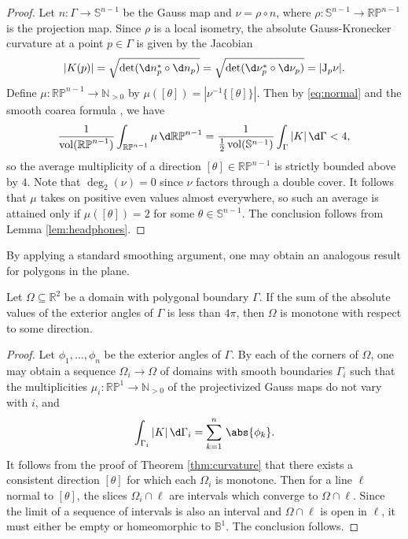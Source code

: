 \begin{proof}
  Let $n \colon \Gamma \to \mathbb{S}^{n-1}$ be the Gauss map and $\nu = \rho \circ n$, where $\rho \colon \mathbb{S}^{n-1} \to \mathbb{RP}^{n-1}$ is the projection map. Since $\rho$ is a local isometry, the absolute Gauss-Kronecker curvature at a point $p \in \Gamma$ is given by the Jacobian
  \begin{equation}\label{eq:normal}
    |K(p)| = \sqrt{ \det (\d n_p^{*} \circ \d n_p)} = \sqrt{ \det (\d \nu_p^{*} \circ \d \nu_p)} = |\mathrm{J}_p\nu|.
  \end{equation}
  Define $\mu \colon \mathbb{RP}^{n-1} \to \mathbb{N}_{> 0}$ by $\mu([\theta]) = |\nu^{-1}\{[\theta]\}|$. Then by \eqref{eq:normal} and the smooth coarea formula \cite{chavel2006}, we have
  \begin{equation}
    \frac{1}{\operatorname{vol}(\mathbb{RP}^{n-1})} \int_{\mathbb{RP}^{n-1}} \mu \, \d \mathbb{RP}^{n-1} = \frac{1}{\frac{1}{2}\operatorname{vol}(\mathbb{S}^{n-1})}\int_{\Gamma} |K| \, \d \Gamma < 4,
  \end{equation}
  so the average multiplicity of a direction $[\theta] \in \mathbb{RP}^{n-1}$ is strictly bounded above by $4$. Note that $\deg_2 (\nu) =  0$ since $\nu$ factors through a double cover. It follows that $\mu$ takes on positive even values almost everywhere, so such an average is attained only if $\mu([\theta]) = 2$ for some $\theta \in \mathbb{S}^{n-1}$. The conclusion follows from Lemma \ref{lem:headphones}.
\end{proof}

By applying a standard smoothing argument, one may obtain an analogous result for polygons in the plane.

\begin{theorem}
Let $\Omega \subseteq \mathbb{R}^2$ be a domain with polygonal boundary $\Gamma$. If the sum of the absolute values of the exterior angles of $\Gamma$ is less than $4\pi$, then $\Omega$ is monotone with respect to some direction.
\end{theorem}

\begin{proof}
Let $\phi_1, \ldots, \phi_n$ be the exterior angles of $\Gamma$. By  each of the corners of $\Omega$, one may obtain a sequence $\Omega_i \to \Omega$ of domains with smooth boundaries $\Gamma_i$ such that the multiplicities $\mu_i \colon \mathbb{RP}^{1} \to \mathbb{N}_{> 0}$ of the projectivized Gauss maps do not vary with $i$, and
\begin{equation}
  \int_{\Gamma_i} |K| \, \d \Gamma_i = \sum_{k = 1}^{n} \,\abs{\phi_k}.
\end{equation}
It follows from the proof of Theorem \ref{thm:curvature} that there exists a consistent direction $[\theta]$ for which each $\Omega_i$ is monotone. Then for a line $\ell$ normal to $[\theta]$, the slices $\Omega_i \cap \ell$ are intervals which converge to $\Omega \cap \ell$. Since the limit of a sequence of intervals is also an interval and $\Omega \cap \ell$ is open in $\ell$, it must either be empty or homeomorphic to $\mathbb{B}^1$. The conclusion follows.
\end{proof}

